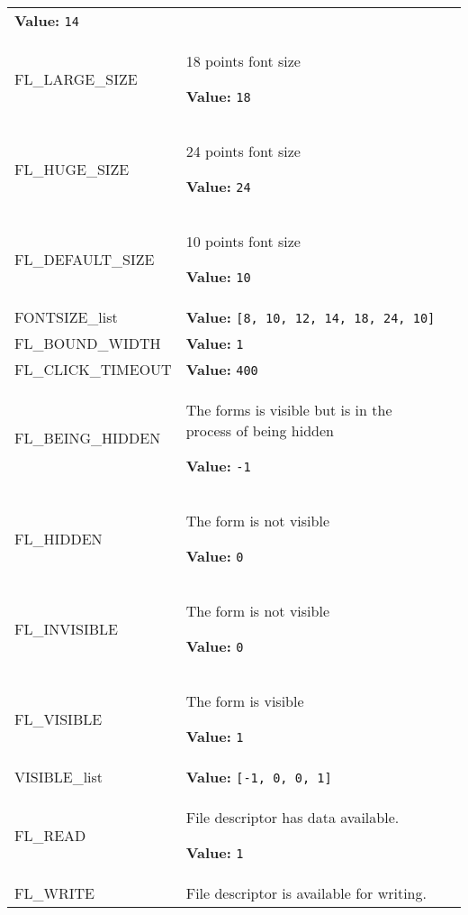 \begin{longtable}{|p{\varnamewidth}|p{\vardescrwidth}|l}
\textbf{Value:} 
{\tt 14}&\\
\cline{1-2}
\raggedright F\-L\-\_\-L\-A\-R\-G\-E\-\_\-S\-I\-Z\-E\- & \raggedright 18 points font size

\textbf{Value:} 
{\tt 18}&\\
\cline{1-2}
\raggedright F\-L\-\_\-H\-U\-G\-E\-\_\-S\-I\-Z\-E\- & \raggedright 24 points font size

\textbf{Value:} 
{\tt 24}&\\
\cline{1-2}
\raggedright F\-L\-\_\-D\-E\-F\-A\-U\-L\-T\-\_\-S\-I\-Z\-E\- & \raggedright 10 points font size

\textbf{Value:} 
{\tt 10}&\\
\cline{1-2}
\raggedright F\-O\-N\-T\-S\-I\-Z\-E\-\_\-l\-i\-s\-t\- & \raggedright \textbf{Value:} 
{\tt \texttt{[}8\texttt{, }10\texttt{, }12\texttt{, }14\texttt{, }18\texttt{, }24\texttt{, }10\texttt{]}}&\\
\cline{1-2}
\raggedright F\-L\-\_\-B\-O\-U\-N\-D\-\_\-W\-I\-D\-T\-H\- & \raggedright \textbf{Value:} 
{\tt 1}&\\
\cline{1-2}
\raggedright F\-L\-\_\-C\-L\-I\-C\-K\-\_\-T\-I\-M\-E\-O\-U\-T\- & \raggedright \textbf{Value:} 
{\tt 400}&\\
\cline{1-2}
\raggedright F\-L\-\_\-B\-E\-I\-N\-G\-\_\-H\-I\-D\-D\-E\-N\- & \raggedright The forms is visible but is in the process of being hidden

\textbf{Value:} 
{\tt -1}&\\
\cline{1-2}
\raggedright F\-L\-\_\-H\-I\-D\-D\-E\-N\- & \raggedright The form is not visible

\textbf{Value:} 
{\tt 0}&\\
\cline{1-2}
\raggedright F\-L\-\_\-I\-N\-V\-I\-S\-I\-B\-L\-E\- & \raggedright The form is not visible

\textbf{Value:} 
{\tt 0}&\\
\cline{1-2}
\raggedright F\-L\-\_\-V\-I\-S\-I\-B\-L\-E\- & \raggedright The form is visible

\textbf{Value:} 
{\tt 1}&\\
\cline{1-2}
\raggedright V\-I\-S\-I\-B\-L\-E\-\_\-l\-i\-s\-t\- & \raggedright \textbf{Value:} 
{\tt \texttt{[}-1\texttt{, }0\texttt{, }0\texttt{, }1\texttt{]}}&\\
\cline{1-2}
\raggedright F\-L\-\_\-R\-E\-A\-D\- & \raggedright File descriptor has data available.

\textbf{Value:} 
{\tt 1}&\\
\cline{1-2}
\raggedright F\-L\-\_\-W\-R\-I\-T\-E\- & \raggedright File descriptor is available for writing.


\end{longtable}
